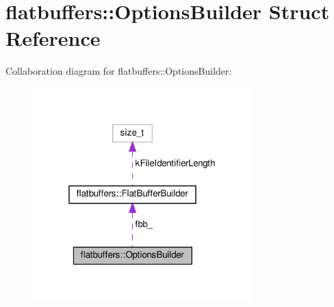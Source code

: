 \hypertarget{structflatbuffers_1_1OptionsBuilder}{}\section{flatbuffers\+:\+:Options\+Builder Struct Reference}
\label{structflatbuffers_1_1OptionsBuilder}


Collaboration diagram for flatbuffers\+:\+:Options\+Builder\+:
\nopagebreak
\begin{figure}[H]
\begin{center}
\leavevmode
\includegraphics[width=241pt]{structflatbuffers_1_1OptionsBuilder__coll__graph}
\end{center}
\end{figure}
